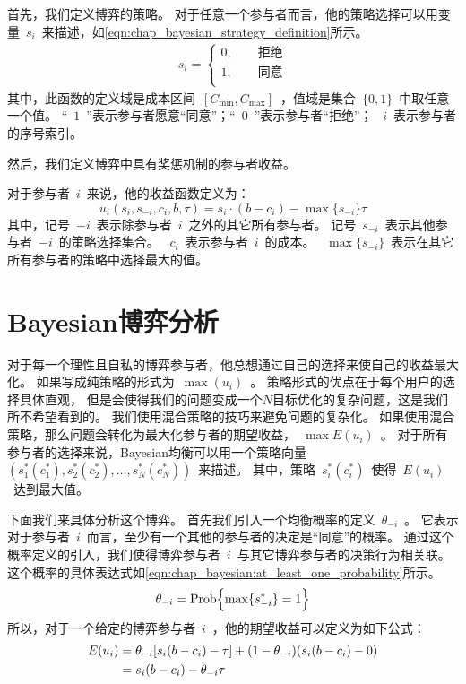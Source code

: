 首先，我们定义博弈的策略。
对于任意一个参与者而言，他的策略选择可以用变量~$s_i$~来描述，如\eqref{eqn:chap_bayesian_strategy_definition}所示。
\begin{align}
    s_i = \begin{cases}
        0, \qquad\text{拒绝}\\
        1, \qquad\text{同意}\\
    \end{cases}
    \label{eqn:chap_bayesian_strategy_definition}
\end{align}
其中，此函数的定义域是成本区间~$[C_{\min}, C_{\max}]$~，值域是集合~$\{0,1\}$~中取任意一个值。
“~$1$~”表示参与者愿意“同意”；“~$0$~”表示参与者“拒绝”；
~$i$~表示参与者的序号索引。

然后，我们定义博弈中具有奖惩机制的参与者收益。

对于参与者~$i$~来说，他的收益函数定义为：
\begin{equation}
 u_i(s_i, s_{-i}, c_i, b, \tau) = s_i\cdot (b - c_i) - \max\{s_{-i}\} \tau
\label{eqn:chap_bayesian_player_payoff}     
\end{equation}
其中，记号~$-i$~表示除参与者~$i$~之外的其它所有参与者。
记号~$s_{-i}$~表示其他参与者~$-i$~的策略选择集合。
~$c_i$~表示参与者~$i$~的成本。
~$\max\{s_{-i}\}$~表示在其它所有参与者的策略中选择最大的值。
%
\section{Bayesian博弈分析}
对于每一个理性且自私的博弈参与者，他总想通过自己的选择来使自己的收益最大化。
如果写成纯策略的形式为~$\max(u_i)$~。
策略形式的优点在于每个用户的选择具体直观，
但是会使得我们的问题变成一个$N$目标优化的复杂问题，这是我们所不希望看到的。
我们使用混合策略的技巧来避免问题的复杂化。
如果使用混合策略，那么问题会转化为最大化参与者的期望收益，~$\max{E(u_i)}$~。
对于所有参与者的选择来说，Bayesian均衡可以用一个策略向量~$( s_1^*(c_1^*), s_2^*(c_2^*), \ldots, s_N^*(c_N^*) )$~来描述。
其中，策略~$s_i^*(c_i^*)$~使得~$E(u_i)$~达到最大值。


下面我们来具体分析这个博弈。
首先我们引入一个均衡概率的定义~$\theta_{-i}$~。
它表示对于参与者~$i$~而言，至少有一个其他的参与者的决定是“同意”的概率。
通过这个概率定义的引入，我们使得博弈参与者~$i$~与其它博弈参与者的决策行为相关联。
这个概率的具体表达式如\eqref{eqn:chap_bayesian:at_least_one_probability}所示。
\begin{equation}
    \theta_{-i} = \hbox{Prob} \Bigl\{ \max\{ s_{-i}^*\} = 1 \Bigr\} 
    \label{eqn:chap_bayesian:at_least_one_probability} 
\end{equation}
所以，对于一个给定的博弈参与者~$i$~，他的期望收益可以定义为如下公式：
\begin{align}
     E(u_i) &= \theta_{-i} [s_i(b-c_i) -\tau] + (1-\theta_{-i}) (s_i(b-c_i) - 0) \notag\\ 
     &= s_i(b-c_i) - \theta_{-i}\tau
    \label{eqn:player_expe_payoff}
\end{align}

